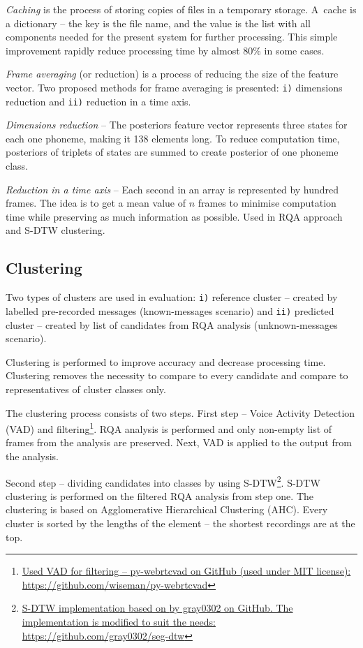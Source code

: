 \documentclass{ExcelAtFIT}
\begin{document}
\textit{Caching} is the process of storing copies of files in a temporary storage. A~cache is a dictionary -- the key is the file name, and the value is the list with all components needed for the present system for further processing. This simple improvement rapidly reduce processing time by almost 80\% in some cases. 

\textit{Frame averaging} (or reduction) is a process of reducing the size of the feature vector.
Two proposed methods for frame averaging is presented: \texttt{i)} dimensions reduction and \texttt{ii)} reduction in a time axis.

\textit{Dimensions reduction} -- The posteriors feature vector represents three states for each one phoneme, making it 138 elements long. To reduce computation time, posteriors of triplets of states are summed to create posterior of one phoneme class.


\textit{Reduction in a time axis} -- Each second in an array is represented by hundred frames. The idea is to get a mean value of $n$ frames to minimise computation time while preserving as much information as possible. Used in RQA approach and S-DTW clustering.
        
    
\subsection{Clustering}
\label{Clustering}
Two types of clusters are used in evaluation: \texttt{i)} reference cluster -- created by labelled pre-recorded messages (known-messages scenario) and \texttt{ii)} predicted cluster -- created by list of candidates from RQA analysis (unknown-messages scenario).

Clustering is performed to improve accuracy and decrease processing time. Clustering removes the necessity to compare to every candidate and compare to representatives of cluster classes only.

The clustering process consists of two steps. First step -- Voice Activity Detection (VAD) and filtering\footnote{\href{https://github.com/wiseman/py-webrtcvad}{Used VAD for filtering -- py-webrtcvad on GitHub (used under MIT license): https://github.com/wiseman/py-webrtcvad}}. RQA analysis is performed and only non-empty list of frames from the analysis are preserved. Next, VAD is applied to the output from the analysis.

Second step -- dividing candidates into classes by using S-DTW\footnote{\href{https://github.com/gray0302/seg-dtw}{S-DTW implementation based on \cite{SDTWpark2006unsupervised} by gray0302 on GitHub. The implementation is modified to suit the needs: https://github.com/gray0302/seg-dtw}}. S-DTW clustering is performed on the filtered RQA analysis from step one. The clustering is based on Agglomerative Hierarchical Clustering (AHC). Every cluster is sorted by the lengths of the element --  the shortest recordings are at the top.
\end{document}
